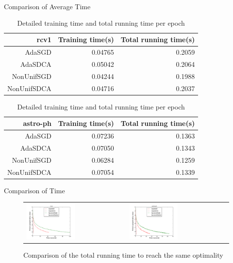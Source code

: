 \begin{frame}{Comparison of Average Time}
\begin{table}[htbp]
    \centering
    \caption{Detailed training time and total running time per epoch}
    \label{table:rcv1_time}
    \begin{tabular}{|r|r|r|}
        \hline 
        rcv1 & Training time(s) & Total running time(s) \\
        \hline
        AdaSGD & 0.04765 & 0.2059 \\
        \hline
        AdaSDCA & 0.05042 & 0.2064 \\
        \hline
        NonUnifSGD & 0.04244 & 0.1988 \\
        \hline
        NonUnifSDCA  & 0.04716 & 0.2037 \\
	\hline
    \end{tabular}
    \label{table:astro-ph_time}
    \begin{tabular}{|r|r|r|}
        \hline 
        astro-ph &  Training time(s) & Total running time(s) \\
        \hline
        AdaSGD & 0.07236 & 0.1363 \\
        \hline
        AdaSDCA & 0.07050 & 0.1343 \\
        \hline
        NonUnifSGD & 0.06284 & 0.1259 \\
        \hline
        NonUnifSDCA  & 0.07054 & 0.1339 \\
        \hline
    \end{tabular}
\end{table}
\end{frame}

\begin{frame}{Comparison of Time}
\begin{figure}[htbp]
\begin{tabular}{ll}
    \centering
        \includegraphics[width=0.5\textwidth]{images/comp_adas_time_rcv1.pdf} &
        \includegraphics[width=0.5\textwidth]{images/comp_adas_time_astro.pdf}
\end{tabular}
        \caption{Comparison of the total running time to reach the same optimality}
     \label{fig:adatime}
\end{figure}
\end{frame}


